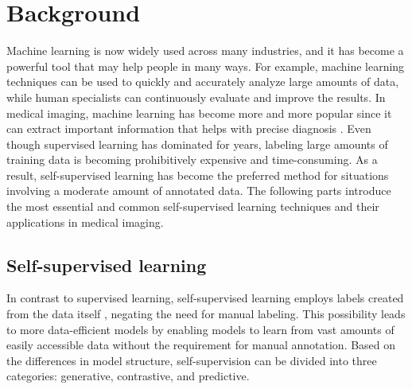 \documentclass[11pt,titlepage,openright]{book}
\begin{document}
\chapter{Background}
\label{cha:background}

Machine learning is now widely used across many industries, and it has become a powerful tool that may help people in many ways. For example, machine learning techniques can be used to quickly and accurately analyze large amounts of data, while human specialists can continuously evaluate and improve the results. In medical imaging, machine learning has become more and more popular since it can extract important information that helps with precise diagnosis \citep{giger2018machine}. Even though supervised learning has dominated for years, labeling large amounts of training data is becoming prohibitively expensive and time-consuming. As a result, self-supervised learning has become the preferred method for situations involving a moderate amount of annotated data. The following parts introduce the most essential and common self-supervised learning techniques and their applications in medical imaging.

\section{Self-supervised learning}
\label{subsec:self-supervised-learning}

In contrast to supervised learning, self-supervised learning employs labels created from the data itself \citep{ssl_generative_or_contrastive}, negating the need for manual labeling. This possibility leads to more data-efficient models by enabling models to learn from vast amounts of easily accessible data without the requirement for manual annotation. Based on the differences in model structure, self-supervision can be divided into three categories: generative, contrastive, and predictive.
\end{document}

